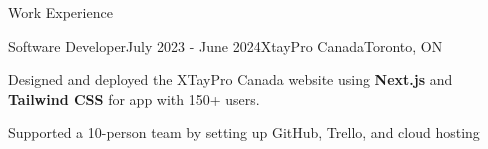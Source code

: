 \documentclass[
	11pt, %
]{resume} %
\begin{document}
\begin{rSection}{Work Experience}

	\begin{rSubsection}{Software Developer}{July 2023 - June 2024}{XtayPro Canada}{Toronto, ON}
		\item Designed and deployed the XTayPro Canada website using \textbf{Next.js} and \textbf{Tailwind CSS} for app with 150+ users.
		\item Supported a 10-person team by setting up GitHub, Trello, and cloud hosting
	\end{rSubsection}





\end{rSection}

\end{document}
